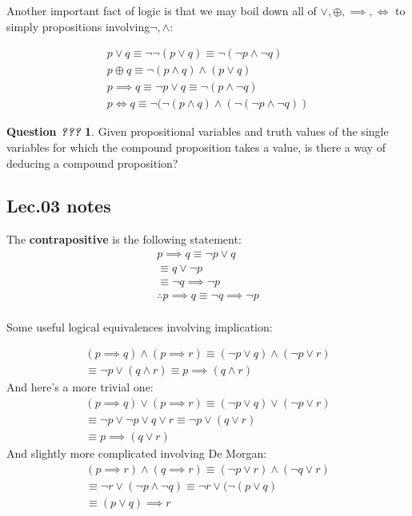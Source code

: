 \documentclass{article}
\theoremstyle{definition}
\numberwithin{equation}{subsection}
\numberwithin{remark}{subsection}
\newtheorem{question}{Question \textit{???}}
\begin{document}
Another important fact of logic is that we may boil down all of $\lor, \oplus, \implies, \iff$ to simply propositions involving$\neg, \land$: 

\begin{align*}
    p \lor q \equiv \neg \neg (p \lor q) \equiv \neg(\neg p \land \neg q)\\
    p \oplus q \equiv \neg(p \land q) \land (p \lor q)\\
    p \implies q \equiv \neg p \lor q \equiv \neg (p \land \neg q)\\
    p \iff q \equiv \neg(\neg(p\land q) \land (\neg (\neg p \land \neg q))
\end{align*}


\begin{question}
Given propositional variables and truth values of the single variables for which the compound proposition takes a value, is there a way of deducing a compound proposition? 
\end{question}
\newpage
\subsection{Lec.03 notes}

The \textbf{contrapositive} is the following statement:
\begin{align*}
    p \implies q \equiv \neg p \lor q\\
    \equiv q \lor \neg p\\
    \equiv \neg q \implies \neg p\\
    \therefore p \implies q \equiv \neg q \implies \neg p
\end{align*}
\\
Some useful logical equivalences involving implication:

\begin{align*}
    (p \implies q) \land (p \implies r) \equiv (\neg p \lor q) \land (\neg p \lor r)\\
    \equiv \neg p \lor (q \land r) \equiv p \implies (q \land r)
\end{align*}
And here's a more trivial one: 
\begin{align*}
    (p \implies q) \lor (p \implies r) \equiv (\neg p \lor q) \lor (\neg p \lor r)\\
    \equiv \neg p \lor \neg p \lor q \lor r \equiv \neg p \lor (q \lor r)\\
    \equiv p \implies (q \lor r)
\end{align*}
And slightly more complicated involving De Morgan:
\begin{align*}
    (p \implies r) \land (q \implies r) \equiv (\neg p \lor r) \land (\neg q \lor r)\\
    \equiv \neg r \lor (\neg p \land \neg q) \equiv \neg r \lor (\neg(p \lor q)\\
    \equiv (p \lor q) \implies r 
\end{align*}
\end{document}
